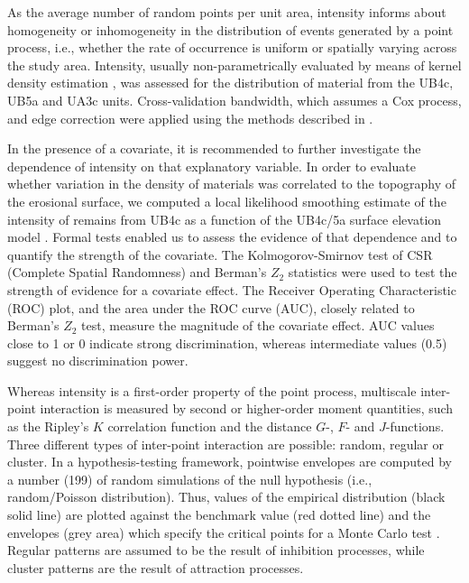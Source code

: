 \documentclass[preprint,authoryear,times]{elsarticle} %
\begin{document}
As the average number of random points per unit area, intensity informs about homogeneity or inhomogeneity in the distribution of events generated by a point process, i.e., whether the rate of occurrence is uniform or spatially varying across the study area. Intensity, usually non-parametrically evaluated by means of kernel density estimation \citep{Diggle1985}, was assessed for the distribution of material from the UB4c, UB5a and UA3c units. Cross-validation bandwidth, which assumes a Cox process, and edge correction were applied using the methods described in \cite{Diggle1985}.

In the presence of a covariate, it is recommended to further investigate the dependence of intensity on that explanatory variable. In order to evaluate whether variation in the density of materials was correlated to the topography of the erosional surface, we computed a local likelihood smoothing estimate of the intensity of remains from UB4c as a function of the UB4c/5a surface elevation model \citep{Baddeley2012}. Formal tests enabled us to assess the evidence of that dependence and to quantify the strength of the covariate. The Kolmogorov-Smirnov test of CSR (Complete Spatial Randomness) and Berman's $Z_2$ statistics were used to test the strength of evidence for a covariate effect. The Receiver Operating Characteristic (ROC) plot, and the area under the ROC curve (AUC), closely related to Berman's $Z_2$ test, measure the magnitude of the covariate effect. AUC values close to 1 or 0 indicate strong discrimination, whereas intermediate values (0.5) suggest no discrimination power.

Whereas intensity is a first-order property of the point process, multiscale inter-point interaction is measured by second or higher-order moment quantities, such as the Ripley's $K$ correlation function \citep{Ripley1976,Ripley1977} and the distance $G$-, $F$- and $J$-functions. Three different types of inter-point interaction are possible: random, regular or cluster. In a hypothesis-testing framework, pointwise envelopes are computed by a number (199) of random simulations of the null hypothesis (i.e., random/Poisson distribution). Thus, values of the empirical distribution (black solid line) are plotted against the benchmark value (red dotted line) and the envelopes (grey area) which specify the critical points for a Monte Carlo test \citep{Ripley1981}. Regular patterns are assumed to be the result of inhibition processes, while cluster patterns are the result of attraction processes.
\end{document}
